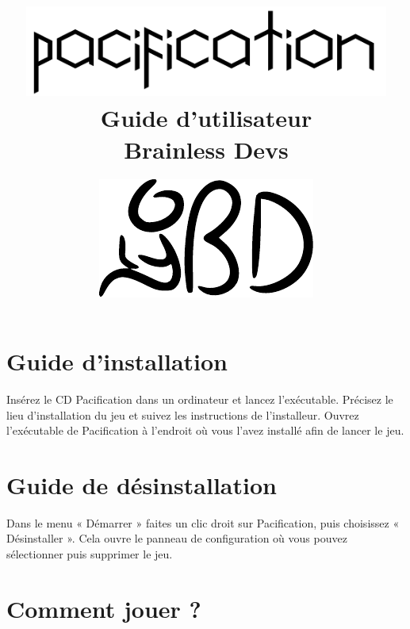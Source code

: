 \documentclass[a5paper, 10pt, twoside]{article}
\begin{document}
\title{
	{\vspace{3em}\protect\centering\protect\includegraphics[width=0.9\textwidth]{Pacification_logo}}\\
    {\vspace{4em}\Huge Guide d'utilisateur}\\
	{\large Brainless Devs}
}
\date{
	{\vfill\protect\centering\protect\includegraphics{brainless_devs.pdf}}\\
}
\maketitle
\cleardoublepage

\section*{Guide d'installation}

Insérez le CD Pacification dans un ordinateur et lancez l'exécutable. Précisez
le lieu d'installation du jeu et suivez les instructions de l'installeur. Ouvrez
l'exécutable de Pacification à l'endroit où vous l'avez installé afin de lancer
le jeu.

\vspace{1cm}

\section*{Guide de désinstallation}

Dans le menu « Démarrer » faites un clic droit sur Pacification, puis choisissez
« Désinstaller ». Cela ouvre le panneau de configuration où vous pouvez
sélectionner puis supprimer le jeu.

\newpage
\section*{Comment jouer ?}
\end{document}

